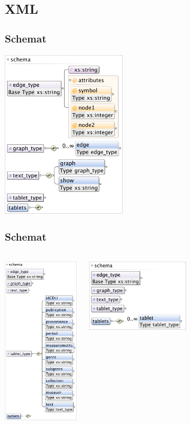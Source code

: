 

\subsection{XML}
\begin{frame}
 \frametitle{Schemat}
\begin{center}
\includegraphics[height=70mm]{../diagramy/schema_text.pdf}
\end{center}

\end{frame}


\begin{frame}
 \frametitle{Schemat}

\begin{columns}[t]
\column{40mm}
\begin{center}
\includegraphics[height=70mm]{../diagramy/schema_tablet.pdf}
\end{center}
\column{40mm}
\begin{center}
\includegraphics[height=30mm]{../diagramy/schema_tablets.pdf}
\end{center}
\end{columns}

\end{frame}
